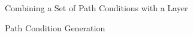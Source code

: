 \begin{definition} {Combining a Set of Path Conditions with a Layer\\}
\label{def:path_cond_set_layer_comb}
\end{definition}


\begin{definition} {Path Condition Generation\\}
\label{def:path_cond_gen}
\end{definition}






